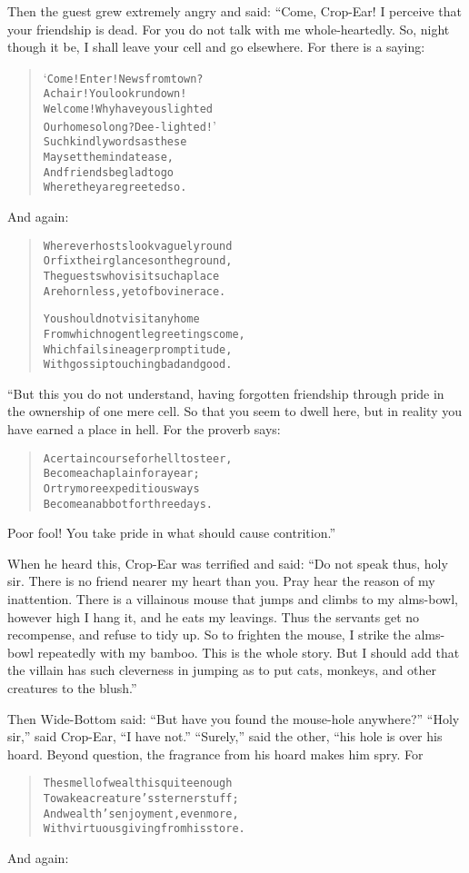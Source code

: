 \documentclass[article, twoside, 14pt]{memoir}
\renewenvironment{verbatim}{%
\begin{quote}%
\vskip -10pt%
\begin{alltt}\normalfont\large}{\end{alltt}%
\end{quote}%
\vskip -10pt
} %
\begin{document}
Then the guest grew extremely angry and said: “Come, Crop-Ear! I
perceive that your friendship is dead. For you do not talk with me
whole-heartedly. So, night though it be, I shall leave your cell
and go elsewhere. For there is a saying:

\begin{verbatim}
‘Come! Enter! News from town?
A chair! You look run down!
Welcome! Why have you slighted
Our home so long? Dee-lighted!’
Such kindly words as these
May set the mind at ease,
And friends be glad to go
Where they are greeted so.
\end{verbatim}
And again:

\begin{verbatim}
Wherever hosts look vaguely round
Or fix their glances on the ground,
The guests who visit such a place
Are hornless, yet of bovine race.

You should not visit any home
From which no gentle greetings come,
Which fails in eager promptitude,
With gossip touching bad and good.
\end{verbatim}
“But this you do not understand, having forgotten friendship
through pride in the ownership of one mere cell. So that you seem
to dwell here, but in reality you have earned a place in hell. For
the proverb says:

\begin{verbatim}
A certain course for hell to steer,
Become a chaplain for a year;
Or try more expeditious ways{\textemdash}
Become an abbot for three days.
\end{verbatim}
Poor fool! You take pride in what should cause contrition.”

When he heard this, Crop-Ear was terrified and said:
``Do not speak thus, holy sir. There is no friend nearer my heart than you. Pray hear the reason of my inattention. There is a villainous mouse that jumps and climbs to my alms-bowl, however high I hang it, and he eats my leavings. Thus the servants get no recompense, and refuse to tidy up. So to frighten the mouse, I strike the alms-bowl repeatedly with my bamboo. This is the whole story. But I should add that the villain has such cleverness in jumping as to put cats, monkeys, and other creatures to the blush.''

Then Wide-Bottom said:
``But have you found the mouse-hole anywhere?'' ``Holy sir,'' said
Crop-Ear, ``I have not.'' ``Surely,'' said the other, “his hole is
over his hoard. Beyond question, the fragrance from his hoard makes
him spry. For

\begin{verbatim}
The smell of wealth is quite enough
To wake a creature's sterner stuff;
And wealth's enjoyment, even more,
With virtuous giving from his store.
\end{verbatim}
And again:
\end{document}
